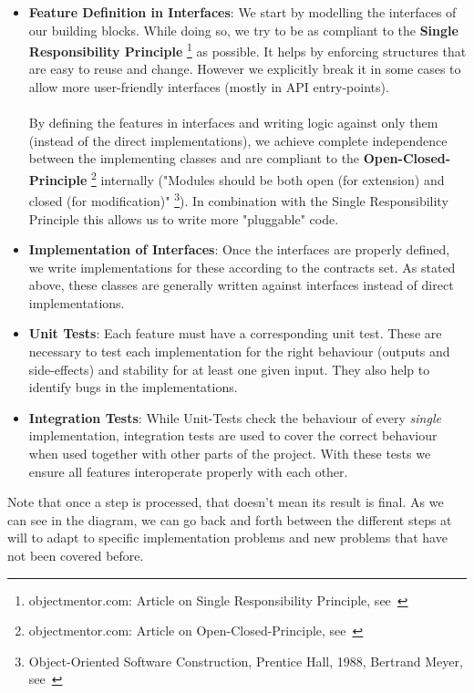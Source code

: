 \begin{itemize}
	\item \textbf{Feature Definition in Interfaces}: We start by modelling the interfaces of our building blocks. While doing so, we try to be as compliant to the \textbf{Single Responsibility Principle} \footnote{objectmentor.com: Article on Single Responsibility Principle, see~\cite{singleresponsibility_objectmentor}} as possible. It helps by enforcing structures that are easy to reuse and change. However we explicitly break it in some cases to allow more user-friendly interfaces (mostly in API entry-points).
	\\\\
	By defining the features in interfaces and writing logic against only them (instead of the direct implementations), we achieve complete independence between the implementing classes and are compliant to the \textbf{Open-Closed-Principle} \footnote{	objectmentor.com: Article on Open-Closed-Principle, see~\cite{openclosed_objectmentor}} internally ("Modules should be both open (for extension) and closed (for modification)" \footnote{Object-Oriented Software Construction, Prentice Hall, 1988, Bertrand Meyer, see~\cite{openclosed_bertrand}}). In combination with the Single Responsibility Principle this allows us to write more "pluggable" code.
	\item \textbf{Implementation of Interfaces}: Once the interfaces are properly defined, we write implementations for these according to the contracts set. As stated above, these classes are generally written against interfaces instead of direct implementations.
	\item \textbf{Unit Tests}: Each feature must have a corresponding unit test. These are necessary to test each implementation for the right behaviour (outputs and side-effects) and stability for at least one given input. They also help to identify bugs in the implementations.
	\item \textbf{Integration Tests}: While Unit-Tests check the behaviour of every \textit{single} implementation, integration tests are used to cover the correct behaviour when used together with other parts of the project. With these tests we ensure all features interoperate properly with each other.
\end{itemize}
\noindent
Note that once a step is processed, that doesn't mean its result is final. As we can see in the diagram, we can go back and forth between the different steps at will to adapt to specific implementation problems and new problems that have not been covered before.
